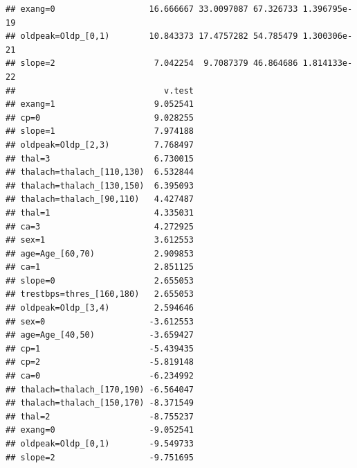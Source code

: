\documentclass[]{article}
\begin{document}
\begin{verbatim}
## exang=0                   16.666667 33.0097087 67.326733 1.396795e-19
## oldpeak=Oldp_[0,1)        10.843373 17.4757282 54.785479 1.300306e-21
## slope=2                    7.042254  9.7087379 46.864686 1.814133e-22
##                              v.test
## exang=1                    9.052541
## cp=0                       9.028255
## slope=1                    7.974188
## oldpeak=Oldp_[2,3)         7.768497
## thal=3                     6.730015
## thalach=thalach_[110,130)  6.532844
## thalach=thalach_[130,150)  6.395093
## thalach=thalach_[90,110)   4.427487
## thal=1                     4.335031
## ca=3                       4.272925
## sex=1                      3.612553
## age=Age_[60,70)            2.909853
## ca=1                       2.851125
## slope=0                    2.655053
## trestbps=thres_[160,180)   2.655053
## oldpeak=Oldp_[3,4)         2.594646
## sex=0                     -3.612553
## age=Age_[40,50)           -3.659427
## cp=1                      -5.439435
## cp=2                      -5.819148
## ca=0                      -6.234992
## thalach=thalach_[170,190) -6.564047
## thalach=thalach_[150,170) -8.371549
## thal=2                    -8.755237
## exang=0                   -9.052541
## oldpeak=Oldp_[0,1)        -9.549733
## slope=2                   -9.751695
\end{verbatim}
\end{document}

